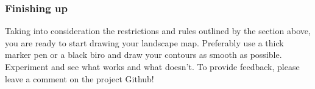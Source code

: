 \documentclass[11pt]{article}
\begin{document}
\subsubsection*{Finishing up}
Taking into consideration the restrictions and rules outlined by the
section above, you are ready to start drawing your landscape map.
Preferably use a thick marker pen or a black biro and draw your
contours as smooth as possible. Experiment and see what works and what
doesn't. To provide feedback, please leave a comment on the project
Github!

\newpage



\end{document}
